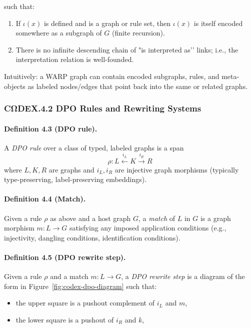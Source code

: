 such that:

\begin{enumerate}
  \item If $\iota(x)$ is defined and is a graph or rule set, then $\iota(x)$
        is itself encoded somewhere as a subgraph of $G$ (finite recursion).

  \item There is no infinite descending chain of "is interpreted as’’ links;
        i.e., the interpretation relation is well-founded.
\end{enumerate}

Intuitively: a WARP graph can contain encoded subgraphs, rules, and meta-objects
as labeled nodes/edges that point back into the same or related graphs.

\subsubsection*{CΩDEX.4.2 \quad DPO Rules and Rewriting Systems}

\paragraph{Definition 4.3 (DPO rule).}
A \emph{DPO rule} over a class of typed, labeled graphs is a span
\[
  \rho : L \xleftarrow{i_L} K \xrightarrow{i_R} R
\]
where $L,K,R$ are graphs and $i_L, i_R$ are injective graph morphisms
(typically type-preserving, label-preserving embeddings).

\paragraph{Definition 4.4 (Match).}
Given a rule $\rho$ as above and a host graph $G$, a \emph{match} of $L$ in
$G$ is a graph morphism $m : L \to G$ satisfying any imposed application
conditions (e.g., injectivity, dangling conditions, identification
conditions).

\paragraph{Definition 4.5 (DPO rewrite step).}
Given a rule $\rho$ and a match $m : L \to G$, a \emph{DPO rewrite step}
is a diagram of the form in Figure~\ref{fig:codex-dpo-diagram} such that:

\begin{itemize}
  \item the upper square is a pushout complement of $i_L$ and $m$,
  \item the lower square is a pushout of $i_R$ and $k$,
\end{itemize}

